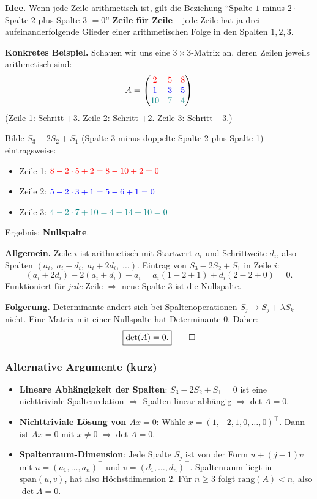 \documentclass[a4paper,12pt]{article}
\begin{document}
\textbf{Idee.} Wenn jede Zeile arithmetisch ist, gilt die Beziehung ``Spalte $1$ minus $2 \cdot$ Spalte $2$ plus Spalte $3$ $= 0$'' \textbf{Zeile f\"ur Zeile} -- jede Zeile hat ja drei aufeinanderfolgende Glieder einer arithmetischen Folge in den Spalten $1, 2, 3$.

\textbf{Konkretes Beispiel.} Schauen wir uns eine $3 \times 3$-Matrix an, deren Zeilen jeweils arithmetisch sind:
\[
A = \begin{pmatrix}
\color{red}2 & \color{red}5 & \color{red}8 \\
\color{blue}1 & \color{blue}3 & \color{blue}5 \\
\color{teal}10 & \color{teal}7 & \color{teal}4
\end{pmatrix}
\]
(Zeile 1: Schritt $+3$. Zeile 2: Schritt $+2$. Zeile 3: Schritt $-3$.)

Bilde $S_3 - 2 S_2 + S_1$ (Spalte 3 minus doppelte Spalte 2 plus Spalte 1) eintragsweise:
\begin{itemize}[leftmargin=*, nosep]
    \item Zeile 1: $\color{red}8 - 2\cdot \color{red}5 + \color{red}2 = 8 - 10 + 2 = 0$
    \item Zeile 2: $\color{blue}5 - 2\cdot \color{blue}3 + \color{blue}1 = 5 - 6 + 1 = 0$
    \item Zeile 3: $\color{teal}4 - 2\cdot \color{teal}7 + \color{teal}10 = 4 - 14 + 10 = 0$
\end{itemize}
Ergebnis: \textbf{Nullspalte}.

\textbf{Allgemein.} Zeile $i$ ist arithmetisch mit Startwert $a_i$ und Schrittweite $d_i$, also Spalten $(a_i,\; a_i + d_i,\; a_i + 2d_i,\; \dots)$. Eintrag von $S_3 - 2 S_2 + S_1$ in Zeile $i$:
\[
(a_i + 2d_i) - 2(a_i + d_i) + a_i = a_i(1 - 2 + 1) + d_i(2 - 2 + 0) = 0.
\]
Funktioniert f\"ur \emph{jede} Zeile $\Rightarrow$ neue Spalte 3 ist die Nullspalte.

\textbf{Folgerung.} Determinante \"andert sich bei Spaltenoperationen $S_j \to S_j + \lambda S_k$ nicht. Eine Matrix mit einer Nullspalte hat Determinante $0$. Daher:
\[
\fbox{$\det(A) = 0$.} \qquad \square
\]

\subsubsection*{Alternative Argumente (kurz)}

\begin{itemize}[leftmargin=*, nosep]
    \item \textbf{Lineare Abh\"angigkeit der Spalten}: $S_3 - 2S_2 + S_1 = 0$ ist eine nichttriviale Spaltenrelation $\Rightarrow$ Spalten linear abh\"angig $\Rightarrow \det A = 0$.
    \item \textbf{Nichttriviale L\"osung von $Ax = 0$}: W\"ahle $x = (1, -2, 1, 0, \dots, 0)^\top$. Dann ist $Ax = 0$ mit $x \neq 0$ $\Rightarrow \det A = 0$.
    \item \textbf{Spaltenraum-Dimension}: Jede Spalte $S_j$ ist von der Form $u + (j-1) v$ mit $u = (a_1, \dots, a_n)^\top$ und $v = (d_1, \dots, d_n)^\top$. Spaltenraum liegt in $\text{span}(u, v)$, hat also H\"ochstdimension $2$. F\"ur $n \geq 3$ folgt $\text{rang}(A) < n$, also $\det A = 0$.
\end{itemize}
\end{document}
